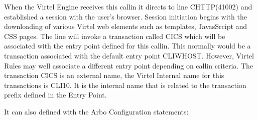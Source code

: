 \documentclass[letterpaper,10pt,english]{sphinxmanual}
\begin{document}
\begin{sphinxVerbatim}[commandchars=\\\{\}]
\end{sphinxVerbatim}

\sphinxAtStartPar
When the Virtel Engine receives this call\sphinxhyphen{}in it directs to line C\sphinxhyphen{}HTTP(41002) and established a session with the user’s browser. Session initiation begins with the downloading of various Virtel web elements such as templates, JavasSrcipt and CSS pages. The line will invoke a transaction called CICS which will be associated with the entry point defined for this call\sphinxhyphen{}in. This normally would be a transaction associated with the default entry point CLIWHOST. However, Virtel Rules may well associate a different entry point depending on call\sphinxhyphen{}in criteria. The transaction CICS is an external name, the Virtel Internal name for this transactions is CLI\sphinxhyphen{}10. It is the internal name that is related to the transaction prefix defined in the Entry Point.

\sphinxAtStartPar
{}

\sphinxAtStartPar
It can also defined with the Arbo Configuration statements:\sphinxhyphen{}

\begin{sphinxVerbatim}[commandchars=\\\{\}]
                                      
                                            
                                   
                                           
                                                 
                                         
                                              
\end{sphinxVerbatim}
\end{document}
